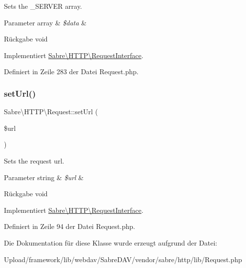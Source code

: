 Sets the \+\_\+\+S\+E\+R\+V\+ER array.


\begin{DoxyParams}[1]{Parameter}
array & {\em \$data} & \\
\hline
\end{DoxyParams}
\begin{DoxyReturn}{Rückgabe}
void 
\end{DoxyReturn}


Implementiert \mbox{\hyperlink{interface_sabre_1_1_h_t_t_p_1_1_request_interface_a025c72064e34e843a8fd402e6407894c}{Sabre\textbackslash{}\+H\+T\+T\+P\textbackslash{}\+Request\+Interface}}.



Definiert in Zeile 283 der Datei Request.\+php.

\mbox{\label{class_sabre_1_1_h_t_t_p_1_1_request_abdd576a7f208efa8438967bac9422093}} 
\subsubsection{\texorpdfstring{set\+Url()}{setUrl()}}
{\footnotesize\ttfamily Sabre\textbackslash{}\+H\+T\+T\+P\textbackslash{}\+Request\+::set\+Url (\begin{DoxyParamCaption}\item[{}]{\$url }\end{DoxyParamCaption})}

Sets the request url.


\begin{DoxyParams}[1]{Parameter}
string & {\em \$url} & \\
\hline
\end{DoxyParams}
\begin{DoxyReturn}{Rückgabe}
void 
\end{DoxyReturn}


Implementiert \mbox{\hyperlink{interface_sabre_1_1_h_t_t_p_1_1_request_interface_aa588eaadc450324b11562119bb1933a0}{Sabre\textbackslash{}\+H\+T\+T\+P\textbackslash{}\+Request\+Interface}}.



Definiert in Zeile 94 der Datei Request.\+php.



Die Dokumentation für diese Klasse wurde erzeugt aufgrund der Datei\+:\begin{DoxyCompactItemize}
\item 
Upload/framework/lib/webdav/\+Sabre\+D\+A\+V/vendor/sabre/http/lib/Request.\+php\end{DoxyCompactItemize}
